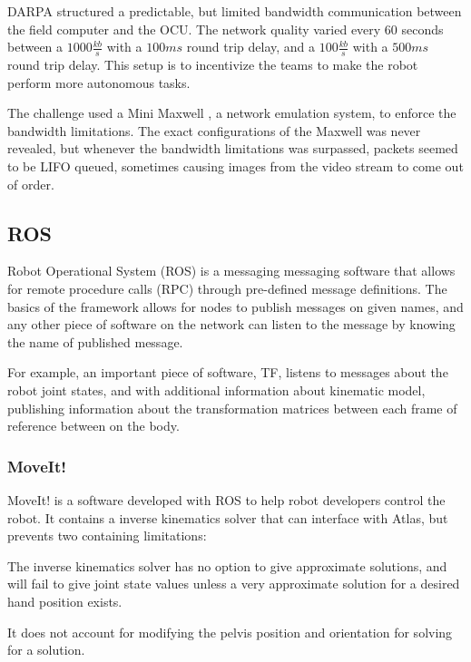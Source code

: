 \documentclass[12pt]{report}
\begin{document}
DARPA structured a predictable, but limited bandwidth communication between the field computer and the OCU. The network quality varied every 60 seconds between a $1000 \frac{kb}{s}$ with a $100ms$ round trip delay, and a $100 \frac{kb}{s}$ with a $500ms$ round trip delay. This setup is to incentivize the teams to make the robot perform more autonomous tasks.

The challenge used a Mini Maxwell \cite{minimaxwell}, a network emulation system, to enforce the bandwidth limitations. The exact configurations of the Maxwell was never revealed, but whenever the bandwidth limitations was surpassed, packets seemed to be LIFO queued, sometimes causing images from the video stream to come out of order. 

\subsection{ROS}

Robot Operational System (ROS) is a messaging messaging software that allows for remote procedure calls (RPC) through pre-defined message definitions. The basics of the framework allows for nodes to publish messages on given names, and any other piece of software on the network can listen to the message by knowing the name of published message. 

For example, an important piece of software, TF, listens to messages about the robot joint states, and with additional information about kinematic model, publishing information about the transformation matrices between each frame of reference between on the body. 

\subsubsection{MoveIt!}
MoveIt! is a software developed with ROS to help robot developers control the robot. It contains a inverse kinematics solver that can interface with Atlas, but prevents two containing limitations: 
\begin{inparaenum}
\item The inverse kinematics solver has no option to give approximate solutions, and will fail to give joint state values unless a very approximate solution for a desired hand position exists.
\item It does not account for modifying the pelvis position and orientation for solving for a solution. \end{inparaenum}
\end{document}
